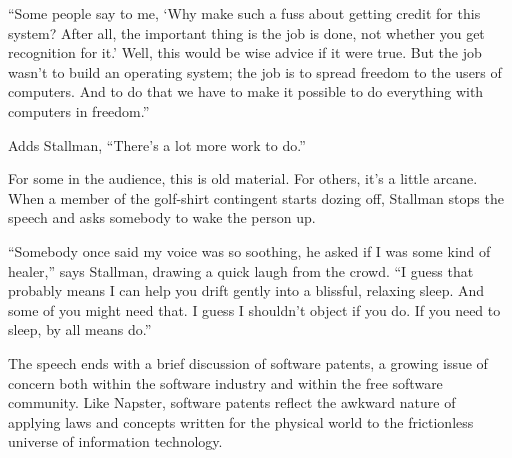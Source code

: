 ``Some people say to me, `Why make such a fuss about getting credit for this system? After all, the important thing is the job is done, not whether you get recognition for it.' Well, this would be wise advice if it were true. But the job wasn't to build an operating system; the job is to spread freedom to the users of computers. And to do that we have to make it possible to do everything with computers in freedom.''

Adds Stallman, ``There's a lot more work to do.''

For some in the audience, this is old material. For others, it's a little arcane. When a member of the golf-shirt contingent starts dozing off, Stallman stops the speech and asks somebody to wake the person up.

``Somebody once said my voice was so soothing, he asked if I was some kind of healer,'' says Stallman, drawing a quick laugh from the crowd. ``I guess that probably means I can help you drift gently into a blissful, relaxing sleep. And some of you might need that. I guess I shouldn't object if you do. If you need to sleep, by all means do.''

The speech ends with a brief discussion of software patents, a growing issue of concern both within the software industry and within the free software community. Like Napster, software patents reflect the awkward nature of applying laws and concepts written for the physical world to the frictionless universe of information technology.

